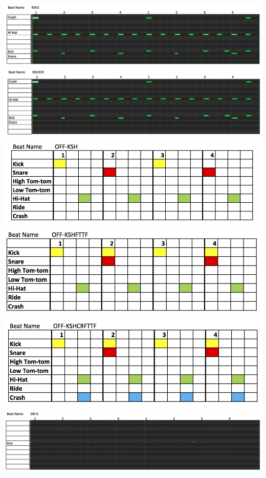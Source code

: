 \documentclass[a4paper, 11pt]{article}
\begin{document}
\begin{center}
\includegraphics[scale=0.25]{images/KSH2.jpg}\\
\includegraphics[scale=0.25]{images/KSH2CR.jpg}\\
\includegraphics[scale=0.3]{images/OFF-KSH.jpg}\\
\includegraphics[scale=0.3]{images/OFF-KSHFTTF.jpg}\\
\includegraphics[scale=0.3]{images/OFF-KSHCRFTTF.jpg}\\
\includegraphics[scale=0.25]{images/SW-K.jpg}\\

\end{center}
\end{document}
